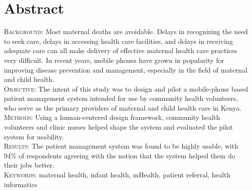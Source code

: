\section{Abstract}
\textsc{Background:} Most maternal deaths are avoidable. Delays in recognizing the need to seek care, delays in accessing  health care facilities, and delays in receiving adequate care can all make delivery of effective maternal health care practices very difficult. In recent years, mobile phones have grown in popularity for improving disease prevention and management, especially in the field of maternal and child health. \\
\textsc{Objective:} The intent of this study was to design and pilot a mobile-phone based patient management system intended for use by community health volunteers, who serve as the primary providers of maternal and child health care in Kenya.  \\
\textsc{Methods:}  Using a human-centered design framework, community health volunteers and clinic nurses helped shape the system and evaluated the pilot system for usability.\\
\textsc{Results:} The patient management system was found to be highly usable, with 94\% of respondents agreeing with the notion that the system helped them do their jobs better. \\
\textsc{Keywords:} maternal health, infant health, mHealth, patient referral, health informatics

